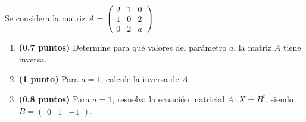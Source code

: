 
Se considera la matriz $A=\begin{pmatrix}2&1&0\\1&0&2\\0&2&a\end{pmatrix}$.
\begin{enumerate}[label=\alph*)]
  \item \textbf{(0.7 puntos)} Determine para qué valores del parámetro $a$,
  la matriz $A$ tiene inversa.
  \item \textbf{(1 punto)} Para $a=1$, calcule la inversa de $A$.
  \item \textbf{(0.8 puntos)} Para $a=1$, resuelva la ecuación matricial
  $A\cdot X=B^t$, siendo $B=\begin{pmatrix}0&1&-1\end{pmatrix}$.
\end{enumerate}
